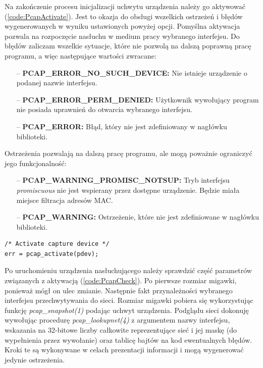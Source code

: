 Na zakończenie procesu inicjalizacji uchwytu urządzenia należy go aktywować (\ref{code:PcapActivate}). Jest to okazja do obsługi wszelkich ostrzeżeń i błędów wygenerowanych w wyniku ustawionych powyżej opcji. Pomyślna aktywacja pozwala na rozpoczęcie nasłuchu w medium pracy wybranego interfejsu. Do błędów zaliczam wszelkie sytuacje, które nie pozwolą na dalszą poprawną pracę programu, a więc następujące wartości zwracane:
\begin{itemize}
\item[--] {\bf PCAP\_ERROR\_NO\_SUCH\_DEVICE:} Nie istnieje urządzenie o podanej nazwie interfejsu. 
\item[--] {\bf PCAP\_ERROR\_PERM\_DENIED:} Użytkownik wywołujący program nie posiada uprawnień do otwarcia wybranego interfejsu.
\item[--] {\bf PCAP\_ERROR:} Błąd, który nie jest zdefiniowany w nagłówku biblioteki. 
\end{itemize}
Ostrzeżenia pozwalają na dalszą pracę programu, ale mogą poważnie ograniczyć jego funkcjonalność:
\begin{itemize}
\item[--] {\bf PCAP\_WARNING\_PROMISC\_NOTSUP:} Tryb interfejsu \emph{promiscuous} nie jest wspierany przez dostępne urządzenie. Będzie miała miejsce filtracja adresów MAC.
\item[--] {\bf PCAP\_WARNING:} Ostrzeżenie, które nie jest zdefiniowane w nagłówku biblioteki.
\end{itemize}

\begin{lstlisting}[frame=tb]
/* Activate capture device */                                        
err = pcap_activate(pdev);
\end{lstlisting}

Po uruchomieniu urządzenia nasłuchującego należy sprawdzić część parametrów związanych z aktywacją (\ref{code:PcapCheck}). Po pierwsze rozmiar migawki, ponieważ mógł on ulec zmianie. Następnie fakt przynależności wybranego interfejsu przechwytywania do sieci. Rozmiar migawki pobiera się wykorzystując funkcję \emph{pcap\_snapshot(1)} podając uchwyt urządzenia. Podglądu sieci dokonuję wywołując procedurę \emph{pcap\_lookupnet(4)} z argumentem nazwy interfejsu, wskazania na 32-bitowe liczby całkowite reprezentujące sieć i jej maskę (do wypełnienia przez wywołanie) oraz tablicę bajtów na kod ewentualnych błędów. Kroki te są wykonywane w celach prezentacji informacji i mogą wygenerować jedynie ostrzeżenia.


